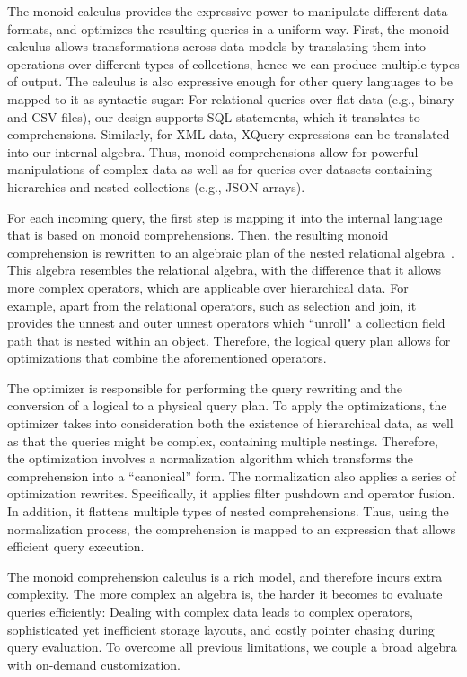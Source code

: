 The monoid calculus provides the expressive power to manipulate different
data formats, and optimizes the resulting queries in a uniform way. First, the monoid
calculus allows transformations across data models by translating them
into operations over different types of collections, hence we can produce 
multiple types of output. The calculus is also expressive enough for 
other query languages to be mapped to it as syntactic sugar: For 
relational queries over flat data (e.g., binary and CSV files), our 
design supports SQL statements, which it translates to 
comprehensions. Similarly, for XML data, XQuery expressions can be
translated into our internal algebra.
%
Thus, monoid comprehensions allow for powerful manipulations of complex data 
as well as for queries over datasets 
containing hierarchies and nested collections (e.g., JSON arrays).

For each incoming query, the first step is mapping it into the internal language
that is based on monoid comprehensions. 
Then, the resulting monoid comprehension is rewritten to an algebraic plan of the 
nested relational algebra~\cite{monoids}. This algebra resembles the 
relational algebra, with the difference that it allows more complex operators, which 
are applicable over hierarchical data. For example, apart from the
relational operators, such as selection and join, it provides
the unnest and outer unnest operators which ``unroll" a collection
field path that is nested within an object. Therefore, the
logical query plan allows for optimizations that combine the aforementioned operators.

The optimizer is responsible for performing the query rewriting and the conversion 
of a logical to a physical query plan. To apply the optimizations, the optimizer
takes into consideration both the existence of hierarchical data, as well as
that the queries might be complex, containing multiple nestings.
Therefore, the optimization involves a normalization algorithm \cite{monoids} 
which transforms the comprehension into a ``canonical'' form. The normalization 
also applies a series of optimization rewrites. Specifically, 
it applies filter pushdown and operator fusion. In addition, it
flattens multiple types of nested comprehensions. Thus, using the normalization
process, the comprehension is mapped to an expression that allows efficient
query execution.

The monoid comprehension calculus
is a rich model, and therefore incurs extra complexity. The more complex an algebra 
is, the harder it becomes to evaluate queries efficiently: Dealing 
with complex data leads to complex operators, sophisticated yet 
inefficient storage layouts, and costly pointer chasing during query 
evaluation. To overcome all previous limitations, we couple a broad 
algebra with on-demand customization.

